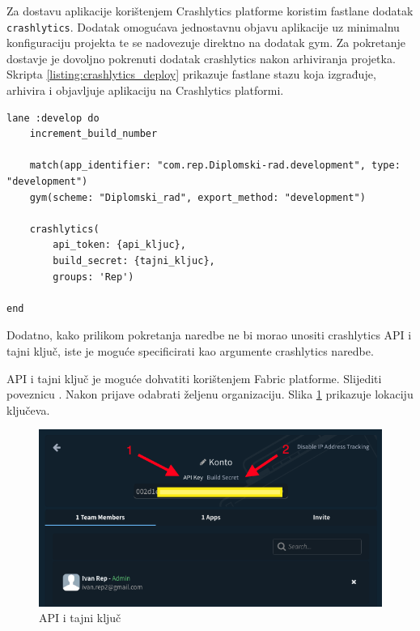 \documentclass[times, utf8, diplomski, numeric]{fer}
\begin{document}
\begin{appendices}
Za dostavu aplikacije korištenjem Crashlytics platforme koristim fastlane dodatak \verb|crashlytics|. Dodatak omogućava jednostavnu objavu aplikacije uz minimalnu konfiguraciju projekta te se nadovezuje direktno na dodatak gym. Za pokretanje dostavje je dovoljno pokrenuti dodatak crashlytics nakon arhiviranja projetka. Skripta \ref{listing:crashlytics_deploy} prikazuje fastlane stazu koja izgrađuje, arhivira i objavljuje aplikaciju na Crashlytics platformi.

\begin{lstlisting}[caption=Fastlane staza za isporuku korištenjem Crashlytics platforme, label=listing:crashlytics_deploy]
lane :develop do
    increment_build_number

    match(app_identifier: "com.rep.Diplomski-rad.development", type: "development")
    gym(scheme: "Diplomski_rad", export_method: "development")

    crashlytics(
        api_token: {api_kljuc},
        build_secret: {tajni_kljuc},
        groups: 'Rep')

end
\end{lstlisting}

Dodatno, kako prilikom pokretanja naredbe ne bi morao unositi crashlytics API i tajni ključ, iste je moguće specificirati kao argumente crashlytics naredbe.

API i tajni ključ je moguće dohvatiti korištenjem Fabric platforme. Slijediti poveznicu . Nakon prijave odabrati željenu organizaciju. Slika \ref{fig:FabricKeys} prikazuje lokaciju ključeva.

\begin{figure}
\centering
\includegraphics[scale=0.5]{FabricKeys}
\caption{API i tajni ključ}
\label{fig:FabricKeys}
\end{figure}


\end{appendices}
\end{document}
